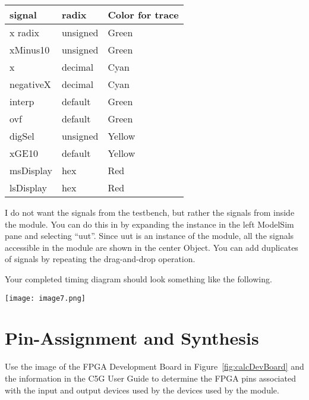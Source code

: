   \begin{tabular}{p{3cm}p{3cm}p{3cm}}
  signal			& radix				& Color for trace \\ \hline
    x radix 		&	unsigned 		& Green  \\
    xMinus10 		&	 unsigned 	& Green  \\
    x 				&  decimal 		& Cyan  \\
    negativeX 		&  decimal 		& Cyan  \\
    interp 			& default 			& Green  \\
    ovf 			& default 			& Green  \\
    digSel 			&  unsigned 		& Yellow  \\
    xGE10 		& default 			& Yellow  \\
    msDisplay 		&  hex 			& Red  \\
    lsDisplay 		&  hex 			& Red  \\
  \end{tabular}

I do not want the signals from the testbench, but rather the signals
from inside the  module. You can do this in  by
expanding the  instance in the left ModelSim pane and
selecting ``uut''. Since uut is an instance of the  module, all
the signals accessible in the  module are shown in the center
Object. You can add duplicates of signals by repeating the drag-and-drop
operation.

Your completed timing diagram should look something like the following.

\texttt{[image:  image7.png]}


\section{Pin-Assignment and Synthesis}

Use the image of the FPGA Development Board in Figure~\ref{fig:calcDevBoard} 
and the information in the C5G User Guide to determine the FPGA pins associated 
with the input and output devices used by the devices used by the  
module.


